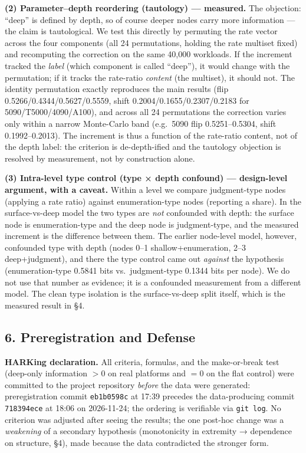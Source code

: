 \documentclass[11pt]{article}
\begin{document}
{{{{\textbf{(2) Parameter--depth reordering (tautology) --- measured.} The objection: ``deep'' is defined by depth, so of course deeper nodes carry more information --- the claim is tautological. We test this directly by permuting the rate vector across the four components (all 24 permutations, holding the rate multiset fixed) and recomputing the correction on the same 40,000 workloads. If the increment tracked the \emph{label} (which component is called ``deep''), it would change with the permutation; if it tracks the rate-ratio \emph{content} (the multiset), it should not. The identity permutation exactly reproduces the main results (flip 0.5266/0.4344/0.5627/0.5559, shift 0.2004/0.1655/0.2307/0.2183 for 5090/T5000/4090/A100), and across all 24 permutations the correction varies only within a narrow Monte-Carlo band (e.g.~5090 flip 0.5251--0.5304, shift 0.1992--0.2013). The increment is thus a function of the rate-ratio content, not of the depth label: the criterion is de-depth-ified and the tautology objection is resolved by measurement, not by construction alone.

\textbf{(3) Intra-level type control (type × depth confound) --- design-level argument, with a caveat.} Within a level we compare judgment-type nodes (applying a rate ratio) against enumeration-type nodes (reporting a share). In the surface-vs-deep model the two types are \emph{not} confounded with depth: the surface node is enumeration-type and the deep node is judgment-type, and the measured increment is the difference between them. The earlier node-level model, however, confounded type with depth (nodes 0--1 shallow+enumeration, 2--3 deep+judgment), and there the type control came out \emph{against} the hypothesis (enumeration-type 0.5841 bits vs.~judgment-type 0.1344 bits per node). We do not use that number as evidence; it is a confounded measurement from a different model. The clean type isolation is the surface-vs-deep split itself, which is the measured result in §4.

\subsection{6. Preregistration and Defense}\label{preregistration-and-defense}

\textbf{HARKing declaration.} All criteria, formulas, and the make-or-break test (deep-only information \(> 0\) on real platforms and \(= 0\) on the flat control) were committed to the project repository \emph{before} the data were generated: preregistration commit \texttt{eb1b0598c} at 17:39 precedes the data-producing commit \texttt{718394ece} at 18:06 on 2026-11-24; the ordering is verifiable via \texttt{git\ log}. No criterion was adjusted after seeing the results; the one post-hoc change was a \emph{weakening} of a secondary hypothesis (monotonicity in extremity → dependence on structure, §4), made because the data contradicted the stronger form.

}}}}
\end{document}
